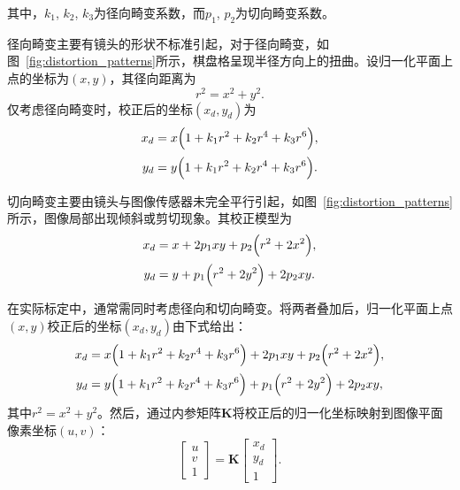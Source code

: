 其中，$k_1$, $k_2$, $k_3$为径向畸变系数，而$p_1$, $p_2$为切向畸变系数。


径向畸变主要有镜头的形状不标准引起，对于径向畸变，如图~\ref{fig:distortion_patterns}所示，棋盘格呈现半径方向上的扭曲。设归一化平面上点的坐标为$(x,y)$，其径向距离为
\begin{equation}
	r^2 = x^2 + y^2.
\end{equation}
仅考虑径向畸变时，校正后的坐标$(x_d,y_d)$为
\begin{equation}
	\begin{aligned}
		x_{d} &= x\Bigl(1 + k_1r^2 + k_2r^4 + k_3r^6\Bigr),\\[2pt]
		y_{d} &= y\Bigl(1 + k_1r^2 + k_2r^4 + k_3r^6\Bigr).
	\end{aligned}
\end{equation}


切向畸变主要由镜头与图像传感器未完全平行引起，如图~\ref{fig:distortion_patterns}所示，图像局部出现倾斜或剪切现象。其校正模型为
\begin{equation}
	\begin{aligned}
		x_{d} &= x + 2p_1 xy + p_2\Bigl(r^2 + 2x^2\Bigr),\\[2pt]
		y_{d} &= y + p_1\Bigl(r^2 + 2y^2\Bigr) + 2p_2 xy.
	\end{aligned}
\end{equation}

在实际标定中，通常需同时考虑径向和切向畸变。将两者叠加后，归一化平面上点$(x,y)$校正后的坐标$(x_d,y_d)$由下式给出：
\begin{equation}
	\begin{aligned}
		x_{d} &= x\Bigl(1 + k_1r^2 + k_2r^4 + k_3r^6\Bigr)
		+ 2p_1 xy + p_2\Bigl(r^2 + 2x^2\Bigr),\\[2pt]
		y_{d} &= y\Bigl(1 + k_1r^2 + k_2r^4 + k_3r^6\Bigr)
		+ p_1\Bigl(r^2 + 2y^2\Bigr) + 2p_2 xy,
	\end{aligned}
	\label{eq:comprehensive_distortion}
\end{equation}
其中$r^2=x^2+y^2$。然后，通过内参矩阵$\mathbf{K}$将校正后的归一化坐标映射到图像平面像素坐标$(u,v)$：
\begin{equation}
	\begin{bmatrix}
		u \\[2pt]
		v \\[2pt]
		1
	\end{bmatrix}
	=
	\mathbf{K}
	\begin{bmatrix}
		x_d \\[2pt]
		y_d \\[2pt]
		1
	\end{bmatrix}.
\end{equation}

